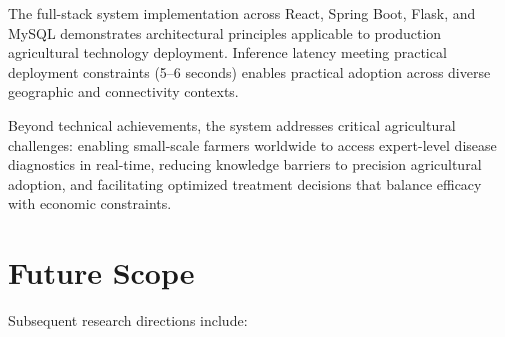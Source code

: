 \documentclass[conference]{IEEEtran}
\begin{document}
The full-stack system implementation across React, Spring Boot, Flask, and MySQL demonstrates architectural principles applicable to production agricultural technology deployment. Inference latency meeting practical deployment constraints (5--6 seconds) enables practical adoption across diverse geographic and connectivity contexts.

Beyond technical achievements, the system addresses critical agricultural challenges: enabling small-scale farmers worldwide to access expert-level disease diagnostics in real-time, reducing knowledge barriers to precision agricultural adoption, and facilitating optimized treatment decisions that balance efficacy with economic constraints.

\section{Future Scope}
\label{sec:future}

Subsequent research directions include:
\end{document}
